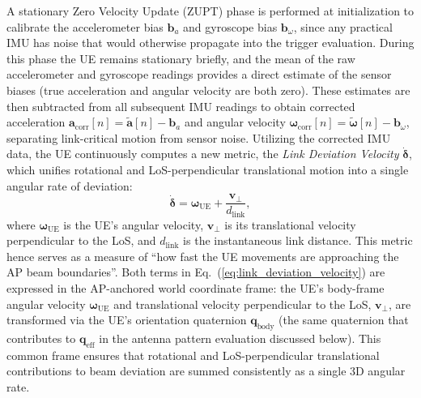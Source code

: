 \documentclass[fleqn,10pt]{wlscirep}
\newcommand{\rev}[1]{#1}
\begin{document}
A stationary Zero Velocity Update (ZUPT) phase is performed at initialization to calibrate the accelerometer bias $\mathbf{b}_a$ and gyroscope bias $\mathbf{b}_\omega$, since any practical IMU has noise that would otherwise propagate into the trigger evaluation. During this phase the UE remains stationary briefly, and the mean of the raw accelerometer and gyroscope readings provides a direct estimate of the sensor biases (true acceleration and angular velocity are both zero). These estimates are then subtracted from all subsequent IMU readings to obtain corrected acceleration $\mathbf{a}_{\text{corr}}[n] = \tilde{\mathbf{a}}[n] - \mathbf{b}_a$ and angular velocity $\boldsymbol{\omega}_{\text{corr}}[n] = \tilde{\boldsymbol{\omega}}[n] - \mathbf{b}_\omega$, separating link-critical motion from sensor noise. Utilizing the corrected IMU data, the UE continuously computes a new metric, the \emph{Link Deviation Velocity} $\dot{\boldsymbol{\delta}}$, which unifies rotational and LoS-perpendicular translational motion into a single angular rate of deviation:
\begin{equation}
    \dot{\boldsymbol{\delta}} = \boldsymbol{\omega}_{\text{UE}} + \frac{\mathbf{v}_{\perp}}{d_{\text{link}}},
    \label{eq:link_deviation_velocity}
\end{equation}
where $\boldsymbol{\omega}_{\text{UE}}$ is the UE's angular velocity, $\mathbf{v}_{\perp}$ is its translational velocity perpendicular to the LoS, and $d_{\text{link}}$ is the instantaneous link distance. This metric hence serves as a measure of ``how fast the UE movements are approaching the AP beam boundaries''. \rev{Both terms in Eq.~(\ref{eq:link_deviation_velocity}) are expressed in the AP-anchored world coordinate frame: the UE's body-frame angular velocity $\boldsymbol{\omega}_{\text{UE}}$ and translational velocity perpendicular to the LoS, $\mathbf{v}_{\perp}$, are transformed via the UE's orientation quaternion $\mathbf{q}_{\text{body}}$ (the same quaternion that contributes to $\mathbf{q}_{\text{eff}}$ in the antenna pattern evaluation discussed below). This common frame ensures that rotational and LoS-perpendicular translational contributions to beam deviation are summed consistently as a single 3D angular rate.}
\end{document}
